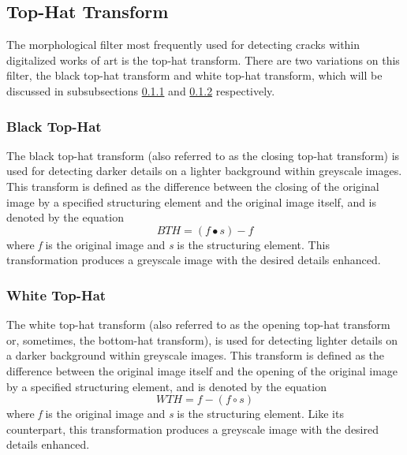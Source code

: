\documentclass{sig-alternate}
\begin{document}
\subsection{Top-Hat Transform}
The morphological filter most frequently used for detecting cracks within digitalized works of art is the top-hat transform. There are two variations on this filter, the black top-hat transform and white top-hat transform, which will be discussed in subsubsections \ref{black top-hat} and \ref{white top-hat} respectively.

\subsubsection{Black Top-Hat}\label{black top-hat}
The black top-hat transform (also referred to as the closing top-hat transform) is used for detecting darker details on a lighter background within greyscale images\cite{Altarpiece:2013, TopHat:2010}. This transform is defined as the difference between the closing of the original image by a specified structuring element and the original image itself, and is denoted by the equation
\begin{equation*}
BTH = (f \bullet s) - f
\end{equation*}
where \textit{f} is the original image and \textit{s} is the structuring element. This transformation produces a greyscale image with the desired details enhanced.

\subsubsection{White Top-Hat}\label{white top-hat}
The white top-hat transform (also referred to as the opening top-hat transform or, sometimes, the bottom-hat transform), is used for detecting lighter details on a darker background within greyscale images\cite{Altarpiece:2013, TopHat:2010}. This transform is defined as the difference between the original image itself and the opening of the original image by a specified structuring element, and is denoted by the equation
\begin{equation*}
WTH = f - (f \circ s)
\end{equation*}
where \textit{f} is the original image and \textit{s} is the structuring element. Like its counterpart, this transformation produces a greyscale image with the desired details enhanced.
\end{document}
